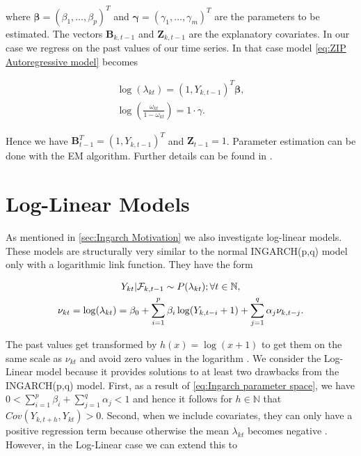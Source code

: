 where $\bm{\beta} = (\beta_1,\ldots,\beta_p)^T$ and $\bm{\gamma}=(\gamma_1,\ldots,\gamma_m)^T$ are the parameters to be estimated. The vectors $\bm{B}_{k,t-1}$ and $\bm{Z}_{k,t-1}$ are the explanatory covariates. In our case we regress on the past values of our time series. In that case model \ref{eq:ZIP Autoregressive model} becomes

\begin{gather}
\log(\lambda_{kt}) = (1,Y_{k,t-1})^T \bm{\beta},\\
\log\left(\frac{\omega_{kt}}{1-\omega_{kt}}\right)= 1 \cdot \gamma.
\label{eq:ZIP Autoregressive model timeseries}
\end{gather}

Hence we have $\bm{B}^T_{t-1} = (1,Y_{k,t-1})^T$ and $\bm{Z}_{t-1} = 1$. Parameter estimation can be done with the EM algorithm. Further details can be found in \cite{Yang:2013}.

\section{Log-Linear Models}
\label{sec: Log-Linear Models}

As mentioned in \ref{sec:Ingarch Motivation} we also investigate log-linear models. These models are structurally very similar to the normal INGARCH(p,q) model only with a logarithmic link function. They have the form 

\begin{gather}
Y_{kt} | \mathcal{F}_{k,t-1} \sim P(\lambda_{kt}); \forall t \in \mathbb{N}, \\
\nu_{kt}= \log(\lambda_{kt}) = \beta_0 + \sum_{i=1}^p\beta_i \log(Y_{k,t-i}+1) + \sum_{j=1}^q\alpha_j \nu_{k,t-j}.
\label{eq:Log-Linear model}
\end{gather}

The past values get transformed by $h(x)=\log(x+1)$ to get them on the same scale as $\nu_{kt}$ and avoid zero values in the logarithm \cite{Liboschik:2016,Fokianos:2011}. We consider the Log-Linear model because it provides solutions to at least two drawbacks from the INGARCH(p,q) model. First, as a result of \ref{eq:Ingarch parameter space}, we have $0 < \sum_{i=1}^p\beta_i + \sum_{j=1}^q\alpha_j < 1$ and hence it follows for $h\in \mathbb{N}$ that $Cov(Y_{k,t+h},Y_{kt})>0$. Second, when we include covariates, they can only have a positive regression term because otherwise the mean $\lambda_{kt}$ becomes negative \cite{Fokianos:2011}. However, in the Log-Linear case we can extend this to

